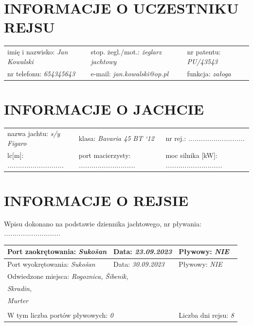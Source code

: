 \documentclass{article}
\begin{document}
\section*{INFORMACJE O UCZESTNIKU REJSU}
\begin{tabularx}{\textwidth}{X X X}
imię i nazwisko: \textit{Jan Kowalski} & stop. żegl./mot.: \textit{żeglarz jachtowy} & nr patentu: \textit{PU/43543} \\
nr telefonu: \textit{654345643} & e-mail: \textit{jan.kowalski@op.pl} & funkcja: \textit{załoga} \\
\end{tabularx}

\section*{INFORMACJE O JACHCIE}

\begin{tabularx}{\textwidth}{X X X}
nazwa jachtu: \textit{s/y Figaro} & klasa: \textit{Bavaria 45 BT ‘12} & nr rej.: \textit{...........................} \\
lc[m]: \textit{...........................} & port macierzysty: \textit{...........................} & moc silnika [kW]: \textit{...........................} \\
\end{tabularx}

\section*{INFORMACJE O REJSIE}

Wpisu dokonano na podstawie dziennika jachtowego, nr pływania: \textit{...........................}
\\

\begin{tabularx}{\textwidth}{|X|X|X|}
\hline
Port zaokrętowania: \textit{Sukošan} & Data: \textit{23.09.2023} & Pływowy: \textit{NIE} \\
\hline
Port wyokrętowania: \textit{Sukošan} & Data: \textit{30.09.2023} & Pływowy: \textit{NIE} \\
\hline
\multicolumn{3}{|l|}{Odwiedzone miejsca:
\textit{Rogoznica, Šibenik,}\dotfill}\\
\multicolumn{3}{|l|}{\textit{ Skradin,}\dotfill} \\
\multicolumn{3}{|l|}{\textit{ Murter}\dotfill} \\
\multicolumn{3}{|l|}{\dotfill} \\
\hline
\multicolumn{2}{|l|}{W tym liczba portów pływowych: \textit{0}} & Liczba dni rejsu: \textit{8}\\
\hline
\end{tabularx}
\\\\
\end{document}
